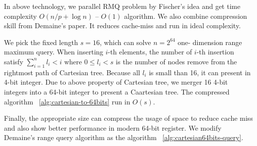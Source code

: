 \iffalse
在 Fischer \cite{fischer} 的論文中，
根據卡塔蘭數 $\frac{1}{s+1}\binom{2s}{s} = O(\frac{4^s}{s^{1.5}})$ 建立查找表 (lookup-table)，
其中選擇 $s = \frac{1}{4} \log n$ 時，空間複雜度 $O(s^2 \frac{4^s}{s^{1.5}}) = o(n)$ 且建表複雜度 $o(n)$。
每一個區間詢問將會拆成 2 個 super-block 和 2 個 in-block 詢問，共計需要 4 次的記憶體存取。
在理論分析上，離線 RMQ 問題可在 $\theta(n)$ -- $\theta(1)$ 時間內解決任一詢問。
當 $n$ 越大時，這 4 次的記憶體存取會遭遇到嚴重的快取未中 (cache miss)，
在 Demaine ~\cite{demaine} 的論文中，發展出快取忘卻 (cache oblivious) 形式的查找方案，
降低在離線版本中的 in-block 詢問產生的快取未中。
\fi

In above technology, we parallel RMQ problem by Fischer's idea and get
time complexity $O(n / p + \log n)$ -- $O(1)$ algorithm.  We also
combine compression skill from Demaine's paper. It reduces cache-miss
and run in ideal complexity.

\iffalse
在上述的技術中，我們可以藉由 Fischer 提出的方案平行化 RMQ 至 $O(n / p + \log n)$ -- $O(1)$，使用 Demaine 提供的技巧壓縮空間使用量，降低快取未中以提升運行效能。這裡我們挑選固定長度的壓縮方案 $s = 16$，其能解決序列長度為 $n = 2^{64}$ 的區間查找，將 16 個整數壓縮成一棵笛卡爾樹。在第 $i$ 次插入時，左旋的次數 $l_i$，每次操作皆符合 $\sum_{i=1}^{n} l_i < i$。
\fi

We pick the fixed length $s = 16$, which can solve $n = 2^{64}$ one-
dimension range maximum query.  When inserting $i$-th elements, the
number of $i$-th insertion satisfy $\sum_{i=1}^{n} l_i < i$ where $0
\le l_i < s$ is the number of nodes remove from the rightmost path of
Cartesian tree.  Because all $l_i$ is small than 16, it can present in
4-bit integer.  Due to above property of Cartesian tree, we merger 16
4-bit integers into a 64-bit integer to present a Caartesian tree.
The compressed algorithm ~\ref{alg:cartesian-to-64bits} run in $O(s)$.

Finally, the appropriate size can compress the usage of space to
reduce cache miss and also show better performance in modern 64-bit
register.  We modify Demaine's range query algorithm as the algorithm
~\ref{alg:cartesian64bits-query}.

\iffalse
因所有 $l_i < 16$，使得每個 $l_i$ 可用 4-bit 表示之，
整體便可用 64-bit 長整數表示一棵笛卡爾樹的狀態。
為了現在常見的 64-byte 快取列 (cache line) 和 64-bit 暫存器 (register) 考量，
我們選用合適的大小進行測試，不僅壓縮空間使用量，同時也減少快取未中的問題。
最後，我們得到壓縮算法 \ref{alg:cartesian-to-64bits}，其相對應的區間查找算法，
根據 Demaine \cite{demaine} 進行修改，得到壓縮下的詢問算法 \ref{alg:cartesian64bits-query}。
\fi

